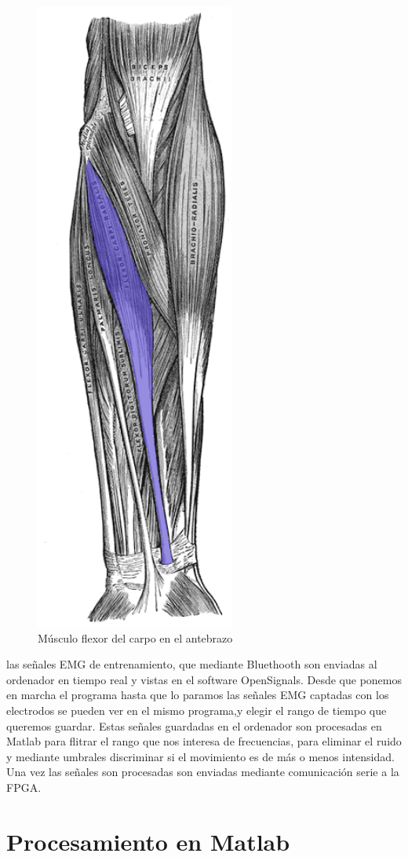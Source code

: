 \begin{figure}[H]
	\center
	\includegraphics[scale=0.5]{imagenes/Implementaciondelsistema/flexor.png}
	\caption{Músculo flexor del carpo en el antebrazo}
	\label{fig:flexor}
\end{figure}


 las señales EMG de entrenamiento, que mediante Bluethooth son enviadas al ordenador en tiempo real y vistas en el software OpenSignals. Desde que ponemos en marcha el programa hasta que lo paramos las señales EMG captadas con los electrodos se pueden ver en el mismo programa,y elegir el rango de tiempo que queremos guardar. Estas señales guardadas en el ordenador son procesadas en Matlab para flitrar el rango que nos interesa de frecuencias, para eliminar el ruido y mediante umbrales discriminar si el movimiento es de más o menos intensidad. \newline
Una vez las señales son procesadas son enviadas mediante comunicación serie a la FPGA.



\section{Procesamiento en Matlab}